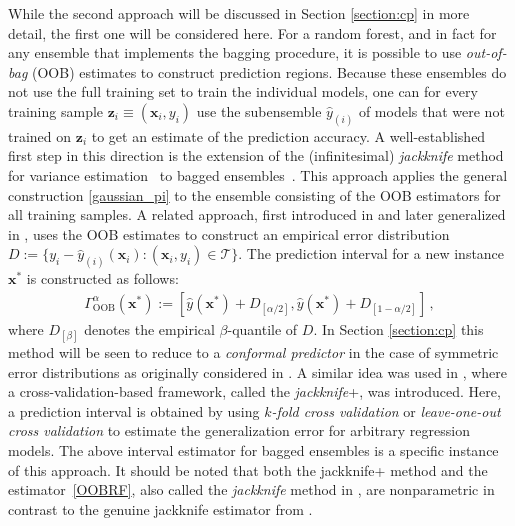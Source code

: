 \documentclass[smallcondensed]{svjour3}
\begin{document}
    While the second approach will be discussed in Section \ref{section:cp} in more detail, the first one will be considered here. For a random forest, and in fact for any ensemble that implements the bagging procedure, it is possible to use \textit{out-of-bag} (OOB) estimates to construct prediction regions. Because these ensembles do not use the full training set to train the individual models, one can for every training sample $\mathbf{z}_i\equiv(\mathbf{x}_i,y_i)$ use the subensemble $\hat{y}_{(i)}$ of models that were not trained on $\mathbf{z}_i$ to get an estimate of the prediction accuracy. A well-established first step in this direction is the extension of the (infinitesimal) \textit{jackknife} method for variance estimation~\cite{miller1974jackknife} to bagged ensembles~\cite{efron1992jackknife,wager2014confidence}. This approach applies the general construction \eqref{gaussian_pi} to the ensemble consisting of the OOB estimators for all training samples. A related approach, first introduced in \cite{johansson2014regression} and later generalized in \cite{oob_rf}, uses the OOB estimates to construct an empirical error distribution $D:=\big\{y_i-\hat{y}_{(i)}(\mathbf{x}_i):(\mathbf{x}_i,y_i)\in\mathcal{T}\big\}$. The prediction interval for a new instance $\mathbf{x}^*$ is constructed as follows:
    \begin{gather}
        \label{OOBRF}
        \Gamma_\text{OOB}^\alpha(\mathbf{x}^*) := \left[\hat{y}(\mathbf{x}^*) + D_{[\alpha/2]}, \hat{y}(\mathbf{x}^*) + D_{[1-\alpha/2]}\right]\,,
    \end{gather}
    where $D_{[\beta]}$ denotes the empirical $\beta$-quantile of $D$. In Section \ref{section:cp} this method will be seen to reduce to a \textit{conformal predictor} in the case of symmetric error distributions as originally considered in \cite{johansson2014regression}. A similar idea was used in \cite{barber2021predictive}, where a cross-validation-based framework, called the \textit{jackknife}+, was introduced. Here, a prediction interval is obtained by using \textit{$k$-fold cross validation} or \textit{leave-one-out cross validation} to estimate the generalization error for arbitrary regression models. The above interval estimator for bagged ensembles is a specific instance of this approach. It should be noted that both the jackknife+ method and the estimator~\eqref{OOBRF}, also called the \textit{jackknife} method in \cite{barber2021predictive}, are nonparametric in contrast to the genuine jackknife estimator from \cite{wager2014confidence}.
\end{document}
